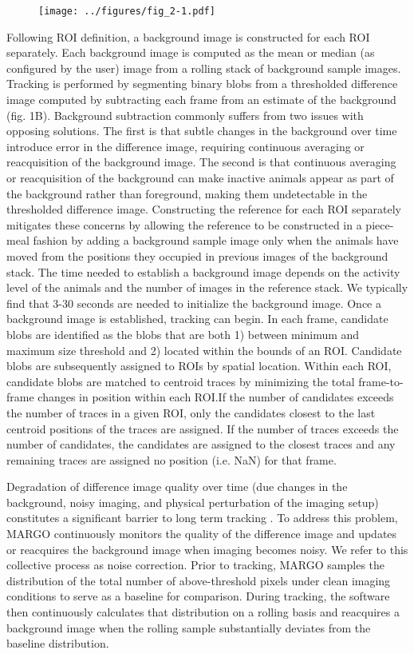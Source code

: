 \documentclass[12pt,letterpaper]{article}
\begin{document}
\begin{figure}
\texttt{[image: ../figures/fig\_2-1.pdf]}
\end{figure}

Following ROI definition, a background image is constructed for each ROI separately. Each background image is computed as the mean or median (as configured by the user) image from a rolling stack of background sample images. Tracking is performed by segmenting binary blobs from a thresholded difference image computed by subtracting each frame from an estimate of the background (fig. 1B). Background subtraction commonly suffers from two issues with opposing solutions. The first is that subtle changes in the background over time introduce error in the difference image, requiring continuous averaging or reacquisition of the background image. The second is that continuous averaging or reacquisition of the background can make inactive animals appear as part of the background rather than foreground, making them undetectable in the thresholded difference image. Constructing the reference for each ROI separately mitigates these concerns by allowing the reference to be constructed in a piece-meal fashion by adding a background sample image only when the animals have moved from the positions they occupied in previous images of the background stack. The time needed to establish a background image depends on the activity level of the animals and the number of images in the reference stack. We typically find that 3-30 seconds are needed to initialize the background image. Once a background image is established, tracking can begin. In each frame, candidate blobs are identified as the blobs that are both 1) between minimum and maximum size threshold and 2) located within the bounds of an ROI. Candidate blobs are subsequently assigned to ROIs by spatial location. Within each ROI, candidate blobs are matched to centroid traces by minimizing the total frame-to-frame changes in position within each ROI.If the number of candidates exceeds the number of traces in a given ROI, only the candidates closest to the last centroid positions of the traces are assigned. If the number of traces exceeds the number of candidates, the candidates are assigned to the closest traces and any remaining traces are assigned no position (i.e. NaN) for that frame.

Degradation of difference image quality over time (due changes in the background, noisy imaging, and physical perturbation of the imaging setup) constitutes a significant barrier to long term tracking \cite{Sridhar_2019}. To address this problem, MARGO continuously monitors the quality of the difference image and updates or reacquires the background image when imaging becomes noisy. We refer to this collective process as noise correction. Prior to tracking, MARGO samples the distribution of the total number of above-threshold pixels under clean imaging conditions to serve as a baseline for comparison. During tracking, the software then continuously calculates that distribution on a rolling basis and reacquires a background image when the rolling sample substantially deviates from the baseline distribution.
\end{document}
